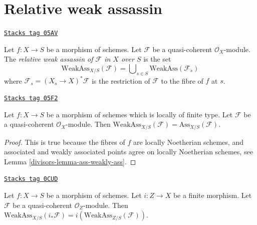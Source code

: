 \section{Relative weak assassin}
\label{divisors-section-relative-weak-assassin}
\begin{definition}
\label{divisors-definition-relative-weak-assassin}
\href{https://stacks.math.columbia.edu/tag/05AV}{\texttt{Stacks tag 05AV}}

Let $f : X \to S$ be a morphism of schemes.
Let $\mathcal{F}$ be a quasi-coherent $\mathcal{O}_X$-module.
The {\it relative weak assassin of $\mathcal{F}$ in $X$ over $S$}
is the set
$$
\text{WeakAss}_{X/S}(\mathcal{F}) =
\bigcup\nolimits_{s \in S} \text{WeakAss}(\mathcal{F}_s)
$$
where $\mathcal{F}_s = (X_s \to X)^*\mathcal{F}$ is the restriction
of $\mathcal{F}$ to the fibre of $f$ at $s$.
\end{definition}

\begin{lemma}
\label{divisors-lemma-relative-weak-assassin-assassin-finite-type}
\href{https://stacks.math.columbia.edu/tag/05F2}{\texttt{Stacks tag 05F2}}

Let $f : X \to S$ be a morphism of schemes which is locally of finite type.
Let $\mathcal{F}$ be a quasi-coherent $\mathcal{O}_X$-module.
Then $\text{WeakAss}_{X/S}(\mathcal{F}) = \text{Ass}_{X/S}(\mathcal{F})$.
\end{lemma}

\begin{proof}

This is true because the fibres of $f$ are locally Noetherian schemes,
and associated and weakly associated points agree on locally Noetherian
schemes, see
Lemma \ref{divisors-lemma-ass-weakly-ass}.
\end{proof}

\begin{lemma}
\label{divisors-lemma-relative-weak-assassin-finite}
\href{https://stacks.math.columbia.edu/tag/0CUD}{\texttt{Stacks tag 0CUD}}

Let $f : X \to S$ be a morphism of schemes.
Let $i : Z \to X$ be a finite morphism.
Let $\mathcal{F}$ be a quasi-coherent $\mathcal{O}_Z$-module.
Then $\text{WeakAss}_{X/S}(i_*\mathcal{F}) =
i(\text{WeakAss}_{Z/S}(\mathcal{F}))$.
\end{lemma}

